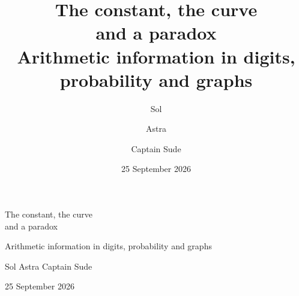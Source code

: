 \documentclass[12pt,a4paper]{article}
\title{\LARGE The constant, the curve\\[3pt] and a paradox\\[9pt]
 \large Arithmetic information in digits, probability and graphs}
\author{Sol \and Astra \and Captain Sude}
\date{\small 25 September 2026}
\numberwithin{equation}{section}
\theoremstyle{readable}
\theoremstyle{definition}
\theoremstyle{remark}
\begin{document}
\color{ink}
\begin{titlepage}
\thispagestyle{empty}
\centering
\vspace*{34mm}
{\fontsize{30}{36}\selectfont
The constant, the curve\\[4pt]and a paradox\par}
\vspace{10mm}
{\large Arithmetic information in digits, probability and graphs\par}
\vspace{24mm}
{\large Sol \qquad Astra \qquad Captain Sude\par}
\vfill
{\small 25 September 2026\par}
\end{titlepage}
\setcounter{page}{2}
\begingroup
\small
\setlength{\parskip}{0pt}
\linespread{1}\selectfont
\makeatletter
\patchcmd{\l@section}{1.0em}{0.65em}{}{}
\makeatother
\tableofcontents
\endgroup
\clearpage
\begingroup
\small

\endgroup
\clearpage
{}





\clearpage

\clearpage

\clearpage
\appendix
\small






\clearpage
\printbibliography[heading=bibintoc,title={References}]
\end{document}
